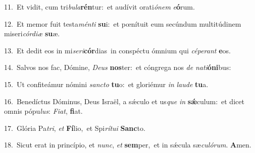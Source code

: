 {\numbfont\textcolor{\numbcolor}{11.}}~Et vidit, cum tri\-\textit{bu}\-\textit{la}\textbf{rén}tur:~\star et audívit orati\-\textit{ó}\-\textit{nem} \textit{e}\-\textbf{ó}rum.\par
{\numbfont\textcolor{\numbcolor}{12.}}~Et memor fuit testa\-\textit{mén}\-\textit{ti} \textbf{su}\-i:~\star et pœnítuit eum secúndum multitúdinem miseri\-\textit{cór}\-\textit{di}\textit{æ} \textbf{su}\-æ.\par
{\numbfont\textcolor{\numbcolor}{13.}}~Et dedit eos in mi\-\textit{se}\-\textit{ri}\textbf{cór}dias~\star in conspéctu ómnium qui \textit{cé}\-\textit{pe}\textit{rant} \textbf{e}\-os.\par
{\numbfont\textcolor{\numbcolor}{14.}}~Salvos nos fac, Dómine, \textit{De}\-\textit{us} \textbf{nos}\-ter:~\star et cóngrega nos \textit{de} \textit{na}\-\textit{ti}\textbf{ó}\textbf{ni}bus:\par
{\numbfont\textcolor{\numbcolor}{15.}}~Ut confiteámur nómini \textit{sanc}\-\textit{to} \textbf{tu}\-o:~\star et gloriémur \textit{in} \textit{lau}\-\textit{de} \textbf{tu}\-a.\par
{\numbfont\textcolor{\numbcolor}{16.}}~Benedíctus Dóminus, Deus Israël, a sǽculo et us\textit{que} \textit{in} \textbf{sǽ}\-culum:~\star et dicet omnis pópu\-\textit{lus}\-: \textit{Fi}\-\textit{at}, \textbf{fi}\-at.\par
{\numbfont\textcolor{\numbcolor}{17.}}~Glória Pa\-\textit{tri}\-, \textit{et} \textbf{Fí}\-lio,~\star et Spi\-\textit{rí}\-\textit{tu}\textit{i} \textbf{Sanc}\-to.\par
{\numbfont\textcolor{\numbcolor}{18.}}~Sicut erat in princípio, et \textit{nunc}\-, \textit{et} \textbf{sem}\-per,~\star et in sǽcula sæ\-\textit{cu}\-\textit{ló}\textit{rum}. \textbf{A}\-men.\par
